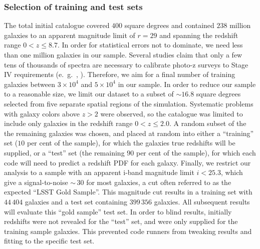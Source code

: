 \subsubsection{Selection of training and test sets}
\label{sec:buzztraining}
The total initial catalogue covered $400$ square degrees and contained $238$ million galaxies to an apparent magnitude limit of $r\!=\!29$ and spanning the redshift range $0\!<\!z\!\leq\!8.7$.  In order for statistical errors not to dominate, we need less than one million galaxies in our sample.  Several studies claim that only a few tens of thousands of spectra are necessary to calibrate photo-z surveys to Stage IV requirements (e.~g.~\citet{Bernstein:10}, \citet{Masters:2017}).  Therefore, we aim for a final number of training galaxies between $3\times 10^{4}$ and $5\times 10^{4}$ in our sample.
In order to reduce our sample to a reasonable size, we limit our dataset to a subset of $\sim\!16.8$ square degrees selected from five separate spatial regions of the simulation. Systematic problems with galaxy colors above $z\!>\!2$ were observed, so the catalogue was limited to include only galaxies in the redshift range $0\!<\!z\!\leq\!2.0$. A random subset of the the remaining galaxies was chosen, and placed at random into either a ``training'' set ($10$ per cent of the sample), for which the galaxies true redshifts will be supplied, or a ``test'' set (the remaining $90$ per cent of the sample), for which each code will need to predict a redshift PDF for each galaxy.  
Finally, we restrict our analysis to a sample with an apparent i-band magnitude limit $i<25.3$, which give a signal-to-noise $\sim\,30$ for most galaxies, a cut often referred to as the expected ``LSST Gold Sample''.  This magnitude cut results in a training set with $44\,404$ galaxies and a test set containing $399\,356$ galaxies.  All subsequent results will evaluate this ``gold sample'' test set.  In order to blind results, initially redshifts were not revealed for the ``test'' set, and were only supplied for the training sample galaxies.  This prevented code runners from tweaking results and fitting to the specific test set.

